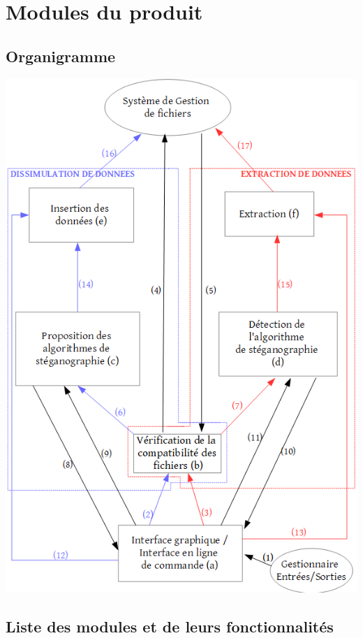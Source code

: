 \documentclass[11pt]{article}
\begin{document}
\section{Modules du produit}
\subsection{Organigramme}

\hspace{1cm}
\includegraphics[scale=0.71]{pictures/organigramme.png}

\subsection{Liste des modules et de leurs fonctionnalités}
\end{document}
